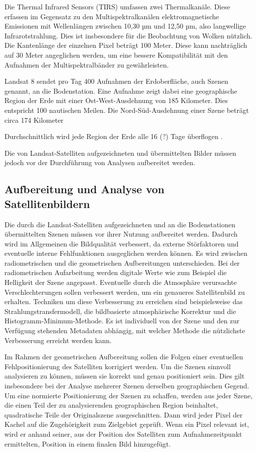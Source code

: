 Die Thermal Infrared Sensors (TIRS) \cite{Chaudhary2011} umfassen zwei Thermalkanäle. Diese erfassen im Gegensatz zu den Multispektralkanälen elektromagnetische Emissionen mit Wellenlängen zwischen 10,30 µm und 12,50 µm, also langwellige Infrarotstrahlung. Dies ist insbesondere für die Beobachtung von Wolken nützlich. Die Kantenlänge der einzelnen Pixel beträgt 100 Meter. Diese kann nachträglich auf 30 Meter angeglichen werden, um eine bessere Kompatibilität mit den Aufnahmen der Multispektralbänder zu gewährleisten.

Landsat 8 sendet pro Tag 400 Aufnahmen der Erdoberfläche, auch Szenen genannt, an die Bodenstation. Eine Aufnahme zeigt dabei eine geographische Region der Erde mit einer Ost-West-Ausdehnung von 185 Kilometer. Dies entspricht 100 nautischen Meilen. Die Nord-Süd-Ausdehnung einer Szene beträgt circa 174 Kilometer 

Durchschnittlich wird jede Region der Erde alle 16 (?) Tage überflogen \cite{Irons2012}.

Die von Landsat-Satelliten aufgezeichneten und übermittelten Bilder müssen jedoch vor der Durchführung von Analysen aufbereitet werden.

\subsection{Aufbereitung und Analyse von Satellitenbildern}
Die durch die Landsat-Satelliten aufgezeichneten und an die Bodenstationen übermittelten Szenen müssen vor ihrer Nutzung aufbereitet werden. Dadurch wird im Allgemeinen die Bildqualität verbessert, da externe Störfaktoren und eventuelle interne Fehlfunktionen ausgeglichen werden können. Es wird zwischen radiometrischen und die geometrischen Aufbereitungen unterschieden. Bei der radiometrischen Aufarbeitung werden digitale Werte wie zum Beispiel die Helligkeit der Szene angepasst. Eventuelle durch die Atmosphäre verursachte Verschlechterungen sollen verbessert werden, um ein genaueres Satellitenbild zu erhalten. Techniken um diese Verbesserung zu erreichen sind beispielsweise das Strahlungstransfermodell, die bildbasierte atmosphärische Korrektur und die Histogramm-Minimum-Methode. Es ist individuell von der Szene und den zur Verfügung stehenden Metadaten abhängig, mit welcher Methode die nützlichste Verbesserung erreicht werden kann.

Im Rahmen der geometrischen Aufbereitung sollen die Folgen einer eventuellen Fehlpositionierung des Satelliten korrigiert werden. Um die Szenen sinnvoll analysieren zu können, müssen sie korrekt und genau positioniert sein. Dies gilt insbesondere bei der Analyse mehrerer Szenen derselben geographischen Gegend. Um eine normierte Positionierung der Szenen zu schaffen, werden aus jeder Szene, die einen Teil der zu analysierenden geographischen Region beinhaltet, quadratische Teile der Originalszene ausgeschnitten. Dann wird jeder Pixel der Kachel auf die Zugehörigkeit zum Zielgebiet geprüft. Wenn ein Pixel relevant ist, wird er anhand seiner, aus der Position des Satelliten zum Aufnahmezeitpunkt ermittelten, Position in einem finalen Bild hinzugefügt. 


